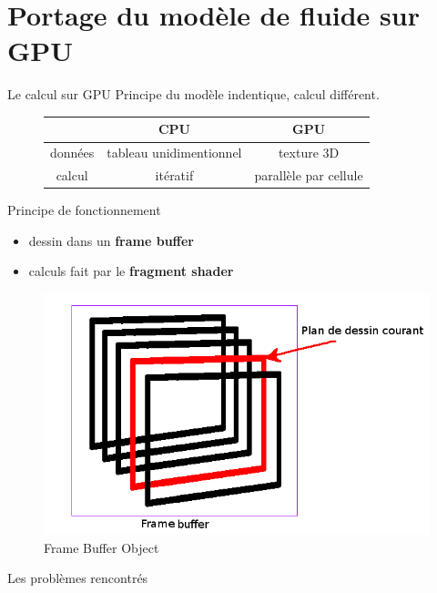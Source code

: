 \documentclass{beamer}
\begin{document}
\section{Portage du modèle de fluide sur GPU}
\begin{frame}{Le calcul sur GPU}
  Principe du modèle indentique, calcul différent.\\
  \begin{figure}[!h]
    \begin{tabular}{c|c|c}
       & CPU & GPU \\
      \hline
      données & tableau unidimentionnel & texture 3D \\
      calcul  & itératif                & parallèle par cellule \\
    \end{tabular}
  \end{figure}
\end{frame}

\begin{frame}{Principe de fonctionnement}
  \begin{itemize}
  \item dessin dans un \textbf{frame buffer}
  \item calculs fait par le \textbf{fragment shader}
  \end{itemize}
  \begin{figure}[!h]
    \centering\includegraphics[scale=0.3]{FBO.png}
    \caption{Frame Buffer Object}
    \label{AvecPerlin}
  \end{figure}
\end{frame}

\begin{frame}{Les problèmes rencontrés}
\end{frame}
\end{document}
